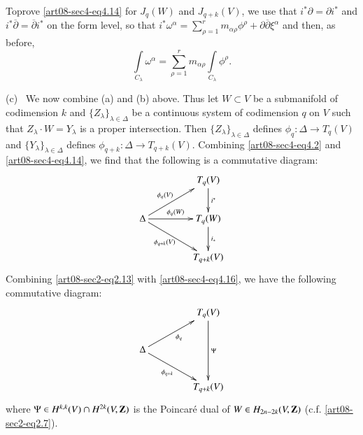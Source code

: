 \begin{remark*}
To\pageoriginale prove \eqref{art08-sec4-eq4.14} for $J_{q}(W)$ and $J_{q+k}(V)$, we use that $i^{*}\partial=\partial i^{*}$ and $i^{*}\overline{\partial}=\overline{\partial}i^{*}$ on the form level, so that $i^{*}\omega^{\alpha}=\sum\limits^{r}_{\rho=1}m_{\alpha\rho}\phi^{\rho}+\partial \overline{\partial}\xi^{\alpha}$ and then, as before,
$$
\int\limits_{C_{\lambda}}\omega^{\alpha}=\sum\limits^{r}_{\rho=1}m_{\alpha\rho}\int\limits_{C_{\lambda}}\phi^{\rho}.
$$
\end{remark*}

(c)~ We now combine (a) and (b) above. Thus let $W\subset V$ be a submanifold of codimension $k$ and $\{Z_{\lambda}\}_{\lambda\in \Delta}$ be a continuous system of codimension $q$ on $V$ such that $Z_{\lambda}\cdot W=Y_{\lambda}$ is a proper intersection. Then $\{Z_{\lambda}\}_{\lambda\in\Delta}$ defines $\phi_{q}:\Delta\to T_{q}(V)$ and $\{Y_{\lambda}\}_{\lambda\in \Delta}$ defines $\phi_{q+k}:\Delta\to T_{q+k}(V)$. Combining \eqref{art08-sec4-eq4.2} and \eqref{art08-sec4-eq4.14}, we find that the following is a commutative diagram:
\begin{equation}
\vcenter{\xymatrix@C=1.5cm{
 & T_{q}(V)\ar[d]^-{i^{*}}\\
\Delta\ar[r]^{\phi_{q}(W)}\ar[dr]_-{\phi_{q+k}(V)}\ar[ur]^-{\phi_{q}(V)} & T_{q}(W)\ar[d]^-{i_{*}}\\
 & T_{q+k}(V)
}}\label{art08-sec4-eq4.16}
\end{equation}
Combining \eqref{art08-sec2-eq2.13} with \eqref{art08-sec4-eq4.16}, we have the following commutative diagram:
\begin{equation}
\vcenter{\xymatrix@C=1.5cm{
 & T_{q}(V)\ar[dd]^-{\Psi}\\
\Delta \ar[ur]_{\phi_{q}}\ar[dr]_-{\phi_{q+k}} & \\
 & T_{q+k}(V)
}}\label{art08-sec4-eq4.17}
\end{equation}
where $\Psi\in H^{k,k}(V)\cap H^{2k}(V,\mathbf{Z})$ is the Poincar\'e dual of $W\in H_{2n-2k}(V,\mathbf{Z})$ (c.f. \eqref{art08-sec2-eq2.7}).

